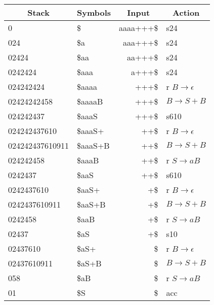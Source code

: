 \documentclass[onecolumn,oneside]{SUSTechHomework}
\begin{document}
    \begin{table}[H]
      \begin{tabular}{|l|l|r|l|}
      \hline
      \multicolumn{1}{|c|}{Stack} & \multicolumn{1}{c|}{Symbols} & \multicolumn{1}{c|}{Input} & \multicolumn{1}{c|}{Action} \\ \hline
      0               & \$       & aaaa+++\$ & s24                        \\ \hline
      024             & \$a      & aaa+++\$  & s24                        \\ \hline
      02424           & \$aa     & aa+++\$   & s24                        \\ \hline
      0242424         & \$aaa    & a+++\$    & s24                        \\ \hline
      024242424       & \$aaaa   & +++\$     & r $B \rightarrow \epsilon$ \\ \hline
      02424242458     & \$aaaaB  & +++\$     & $B \rightarrow S+B$        \\ \hline
      024242437       & \$aaaS   & +++\$     & s610                       \\ \hline
      024242437610    & \$aaaS+  & ++\$      & r $B \rightarrow \epsilon$ \\ \hline
      024242437610911 & \$aaaS+B & ++\$      & $B \rightarrow S+B$        \\ \hline
      024242458       & \$aaaB   & ++\$      & r $S \rightarrow aB$       \\ \hline
      0242437         & \$aaS    & ++\$      & s610                       \\ \hline
      0242437610      & \$aaS+   & +\$       & r $B \rightarrow \epsilon$ \\ \hline
      0242437610911   & \$aaS+B  & +\$       & $B \rightarrow S+B$        \\ \hline
      0242458         & \$aaB    & +\$       & r $S \rightarrow aB$       \\ \hline
      02437           & \$aS     & +\$       & s10                        \\ \hline
      02437610        & \$aS+    & \$        & r $B \rightarrow \epsilon$ \\ \hline
      02437610911     & \$aS+B   & \$        & $B \rightarrow S+B$        \\ \hline
      058             & \$aB     & \$        & r $S \rightarrow aB$       \\ \hline
      01              & \$S      & \$        & acc                        \\ \hline
      \end{tabular}
    \end{table}
\end{document}
